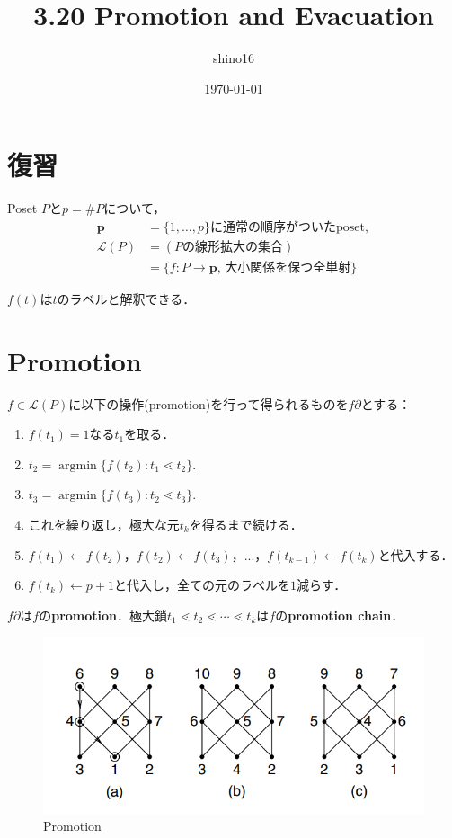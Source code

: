 \documentclass[xelatex,ja=standard,a4paper,14pt,everyparhook=compat]{bxjsarticle}
\title{3.20 Promotion and Evacuation}
\author{shino16}
\date{\today}
\newcommand{\mcL}{\mathcal{L}}
\theoremstyle{definition}
\begin{document}
\maketitle

\tableofcontents

\newpage

\setcounter{section}{-1}
\section{復習}

Poset $P$と$p = \#P$について，
\begin{align*}
    \bm p &= \text{$\{1,\ldots,p\}$に通常の順序がついたposet}, \\
    \mcL(P) &= (\text{$P$の線形拡大の集合}) \\
    &= \{f : \text{$P \to \bm p$, 大小関係を保つ全単射}\}
\end{align*}

$f(t)$は$t$のラベルと解釈できる．

\section{Promotion}

$f \in \mcL(P)$に以下の操作(promotion)を行って得られるものを$f\partial$とする：
\begin{enumerate}[1.]
    \item $f(t_1) = 1$なる$t_1$を取る．
    \item $t_2 = \operatorname{argmin} \{f(t_2) : t_1 \lessdot t_2\}$.
    \item $t_3 = \operatorname{argmin} \{f(t_3) : t_2 \lessdot t_3\}$.
    \item これを繰り返し，極大な元$t_k$を得るまで続ける．
    \item $f(t_1) \gets f(t_2)$，$f(t_2) \gets f(t_3)$，...，$f(t_{k-1}) \gets f(t_k)$と代入する．
    \item $f(t_k) \gets p+1$と代入し，全ての元のラベルを$1$減らす．
\end{enumerate}

$f\partial$は$f$の\textbf{promotion}．極大鎖$t_1 \lessdot t_2 \lessdot \cdots \lessdot t_k$は$f$の\textbf{promotion chain}．

\begin{figure}[H]
    \centering
    \includegraphics[width=.7\textwidth]{3.36.png}
    \caption{Promotion}
\end{figure}
\end{document}
